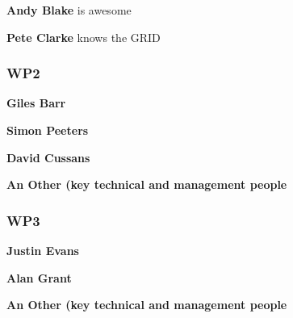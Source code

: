 \noindent
{\bf Andy Blake} is awesome

\noindent
{\bf Pete Clarke} knows the GRID

\subsubsection{WP2}

\noindent
{\bf Giles Barr} 

\noindent
{\bf Simon Peeters} 

\noindent
{\bf David Cussans} 

\noindent
{\bf An Other (key technical and management people} 


\subsubsection{WP3}

\noindent
{\bf Justin Evans} 

\noindent
{\bf Alan Grant} 

\noindent
{\bf An Other (key technical and management people} 



